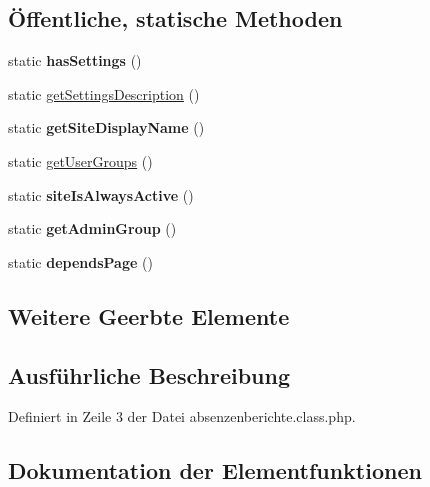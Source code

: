 \subsection*{Öffentliche, statische Methoden}
\begin{DoxyCompactItemize}
\item 
\mbox{\label{classabsenzenberichte_ab1cb19bd6f4cba81458f1cca3065465e}} 
static {\bfseries has\+Settings} ()
\item 
static \mbox{\hyperlink{classabsenzenberichte_aeb142512a36a9e2c810f83b4a4a03beb}{get\+Settings\+Description}} ()
\item 
\mbox{\label{classabsenzenberichte_a31e9274ac00ef520c526b61bdd9c2602}} 
static {\bfseries get\+Site\+Display\+Name} ()
\item 
static \mbox{\hyperlink{classabsenzenberichte_a38543af0b1b92037c513fafe6abaa342}{get\+User\+Groups}} ()
\item 
\mbox{\label{classabsenzenberichte_a0278c768324b5003ec6cd2b664ec9ab4}} 
static {\bfseries site\+Is\+Always\+Active} ()
\item 
\mbox{\label{classabsenzenberichte_ad3da1b4a41b289011989d91393b38d71}} 
static {\bfseries get\+Admin\+Group} ()
\item 
\mbox{\label{classabsenzenberichte_a51e1046f845c8be277f7cd7d25b46b0a}} 
static {\bfseries depends\+Page} ()
\end{DoxyCompactItemize}
\subsection*{Weitere Geerbte Elemente}


\subsection{Ausführliche Beschreibung}


Definiert in Zeile 3 der Datei absenzenberichte.\+class.\+php.



\subsection{Dokumentation der Elementfunktionen}
\mbox{\label{classabsenzenberichte_aeb142512a36a9e2c810f83b4a4a03beb}} 
